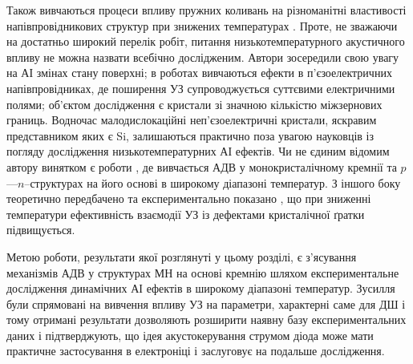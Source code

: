 Також вивчаються процеси впливу пружних коливань на різноманітні властивості напівпровідникових структур при знижених
температурах
\cite{Savkina:FM2003,Savkina:SPQEO2013,Savkina:PJTF2015,Savkina:PSSc2015,Savkina2015,Savkina:JPD2010,kryshtab_savkina_smirnov_2013,
Vlasenko2000r,SavkinaPSSB2002,Zhuravlev,BorkovFTT,sheinkman1995,belyaev1994,buyanova1994,Ostapenko1994,KorotchenAPL1998,KOROTCHENKOV1998,
Korotchenkov1995,KorotchFTP1996,YOlikh:UFG2016,YOlikh:SupMicr,YOlikhTPL2011r}.
Проте, не зважаючи на достатньо широкий перелік робіт, питання низькотемпературного акустичного впливу не можна назвати всебічно дослідженим.
Автори \cite{Savkina:FM2003,Savkina:SPQEO2013,Savkina:PJTF2015,Savkina:PSSc2015,Savkina2015,Savkina:JPD2010,kryshtab_savkina_smirnov_2013}
зосередили свою увагу на АІ змінах стану поверхні;
в роботах \cite{Zhuravlev,BorkovFTT,sheinkman1995,belyaev1994,buyanova1994,Ostapenko1994,KorotchenAPL1998,KOROTCHENKOV1998} вивчаються ефекти в п'єзоелектричних
напівпровідниках, де поширення УЗ супроводжується суттєвими електричними полями;
об'єктом дослідження \cite{Vlasenko2000r,SavkinaPSSB2002,YOlikh:UFG2016,YOlikh:SupMicr} є кристали зі значною кількістю міжзернових границь.
Водночас малодислокаційні неп'єзоелектричні кристали, яскравим представником яких є Si, залишаються практично поза увагою
науковців із погляду дослідження низькотемпературних АІ ефектів.
Чи не єдиним відомим автору винятком є роботи \cite{Korotchenkov1995,KorotchFTP1996,YOlikhTPL2011r},
де вивчається АДВ у монокристалічному кремнії та $p$---$n$--структурах на його основі в широкому діапазоні температур.
З іншого боку теоретично передбачено \cite{Pavlovich} та експериментально показано \cite{YOlikh:UFG2016,YOlikh:SupMicr},
що при зниженні температури ефективність взаємодії УЗ із дефектами кристалічної ґратки підвищується.

Метою роботи, результати якої розглянуті у цьому розділі,
є з'ясування механізмів АДВ у структурах МН на основі кремнію шляхом експериментальне дослідження динамічних АІ ефектів в широкому діапазоні температур.
Зусилля були спрямовані на вивчення впливу УЗ на параметри, характерні саме для ДШ і тому отримані результати дозволяють розширити
наявну базу експериментальних даних і підтверджують, що
ідея акустокерування струмом діода може мати практичне застосування в електроніці і заслуговує на подальше дослідження.


